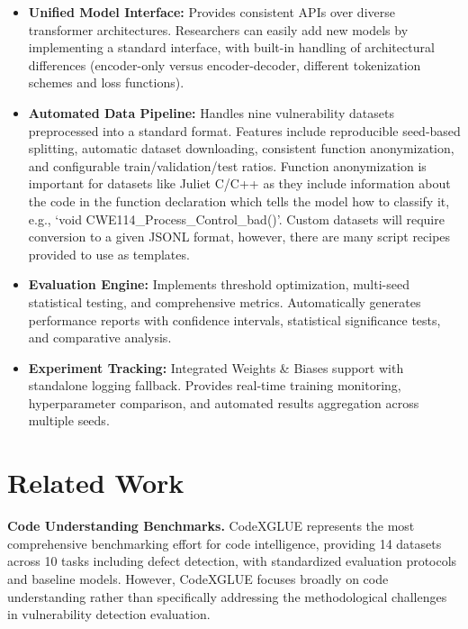 \documentclass[letterpaper]{article}
\begin{document}
\begin{itemize}
	\item \textbf{Unified Model Interface:} Provides consistent APIs over diverse transformer architectures. Researchers can easily add new models by implementing a standard interface, with built-in handling of architectural differences (encoder-only versus encoder-decoder, different tokenization schemes and loss functions).

	\item \textbf{Automated Data Pipeline:} Handles nine vulnerability datasets preprocessed into a standard format. Features 
	include reproducible seed-based splitting, automatic dataset downloading, consistent function anonymization, and configurable train/validation/test ratios. Function anonymization is important for datasets like Juliet C/C++ \citep{juliet2022} as they include information about the code in the function declaration which tells the model how to classify it, e.g., `void CWE114\_Process\_Control\_bad()'. Custom datasets will require conversion to a given JSONL format, however, there are many script recipes provided to use as templates.

	\item \textbf{Evaluation Engine:} Implements threshold optimization, multi-seed statistical testing, and comprehensive metrics. Automatically generates performance reports with confidence intervals, statistical significance tests, and comparative analysis.

	\item \textbf{Experiment Tracking:} Integrated Weights \& Biases support with standalone logging fallback. Provides real-time training monitoring, hyperparameter comparison, and automated results aggregation across multiple seeds.
\end{itemize}

\section{Related Work}

\textbf{Code Understanding Benchmarks.} CodeXGLUE \citep{lu2021codexglue} represents the most comprehensive benchmarking effort for code intelligence, providing 14 datasets across 10 tasks including defect detection, with standardized evaluation protocols and baseline models. However, CodeXGLUE focuses broadly on code understanding rather than specifically addressing the methodological challenges in vulnerability detection evaluation.
\end{document}
